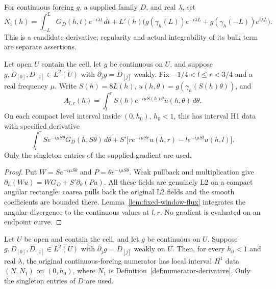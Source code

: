 \begin{definition}
\label{def:numerator-derivative}
\leanok
For continuous forcing $g$, a supplied family $D$, and real $\lambda$, set
\[
 N_1(h)=\int_{-L}^{L}G_D(h,t)e^{-i\lambda t}\,dt+
 L'(h)\bigl(g(\gamma_h(L))e^{-i\lambda L}
            +g(\gamma_h(-L))e^{i\lambda L}\bigr).
\]
This is a candidate derivative; regularity and actual integrability of
its bulk term are separate assertions.
\end{definition}

\begin{lemma}
\label{lem:orbit-window-flux}
\leanok
Let open $U$ contain the cell, let $g$ be continuous on $U$, and suppose
$g,D_{[0]},D_{[1]}\in L^2(U)$ with $\partial_jg=D_{[j]}$ weakly.
Fix $-1/4<l\le r<3/4$ and a real frequency $\mu$.
Write $S(h)=8L(h)$, $u(h,\theta)=g(\gamma_h(S(h)\theta))$, and
\[
 A_{l,r}(h)=\int_l^r S(h)e^{-i\mu S(h)\theta}u(h,\theta)\,d\theta .
\]
On each compact level interval inside $(0,h_0)$, $h_0<1$, this has
interval H1 data with specified derivative
\[
 \int_l^r S e^{-i\mu S\theta}G_D(h,S\theta)\,d\theta+
 S'\bigl[r e^{-i\mu Sr}u(h,r)-l e^{-i\mu Sl}u(h,l)\bigr].
\]
Only the singleton entries of the supplied gradient are used.
\end{lemma}

\begin{proof}
\leanok
Put $W=S e^{-i\mu S\theta}$ and $P=\theta e^{-i\mu S\theta}$.
Weak pullback and multiplication give
$\partial_h(Wu)=W G_D+S'\partial_\theta(Pu)$.
All these fields are genuinely L2 on a compact angular rectangle:
coarea pulls back the original L2 fields and the smooth coefficients
are bounded there. Lemma~\ref{lem:fixed-window-flux} integrates the
angular divergence to the continuous values at $l,r$.
No gradient is evaluated on an endpoint curve.
\end{proof}

\begin{lemma}
\label{lem:numerator-moving-endpoints}
\leanok
Let $U$ be open and contain the cell, and let $g$ be continuous on $U$.
Suppose $g,D_{[0]},D_{[1]}\in L^2(U)$ with
$\partial_jg=D_{[j]}$ weakly on $U$.
Then, for every $h_0<1$ and real $\lambda$, the original continuous-forcing
numerator has local interval $H^1$ data $(N,N_1)$ on $(0,h_0)$,
where $N_1$ is Definition~\ref{def:numerator-derivative}.
Only the singleton entries of $D$ are used.
\end{lemma}

